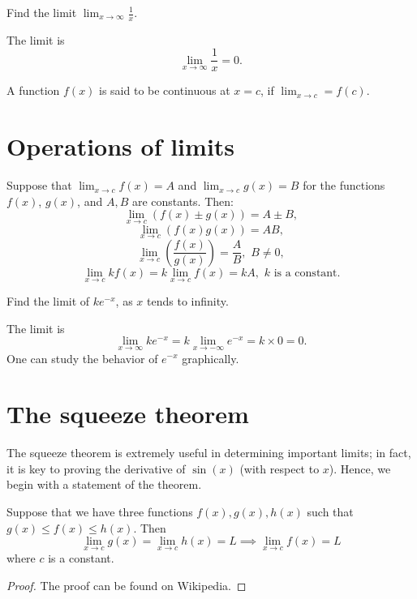 \begin{example}
    Find the limit $\lim_{x \to \infty} \frac{1}{x}$.
\end{example}
\begin{solution}
    The limit is \[\lim_{x \to \infty} \frac{1}{x} = 0.\]
\end{solution}

A function $f(x)$ is said to be continuous at $x = c$, if $\lim_{x \to c} = f(c)$.

\section{Operations of limits}
Suppose that $\lim_{x \to c} f(x) = A$ and $\lim_{x \to c} g(x) = B$ for the functions $f(x)$, $g(x)$,
and $A,B$ are constants. Then:
\[
\lim_{x \to c} (f(x) \pm g(x)) = A \pm B,
\]
\[
\lim_{x \to c} (f(x) g(x)) = A B,
\]
\[
\lim_{x \to c} \left(\frac{f(x)}{g(x)}\right)  = \frac{A}{B},\,\,B\ne 0,
\]
\[
\lim_{x \to c} kf(x) = k\lim_{x \to c} f(x) = kA,\,\,k\,\,\text{is a constant.}
\]

\begin{example}
    Find the limit of $k e^{-x}$, as $x$ tends to infinity. 
\end{example}
\begin{solution}
    The limit is \[\lim_{x \to \infty} k e^{-x} = k \lim_{x \to -\infty} e^{-x} = k \times 0 = 0.\]
    One can study the behavior of $e^{-x}$ graphically.
\end{solution}

\section{The squeeze theorem}
The squeeze theorem is extremely useful in determining important limits; in fact, it is key to proving the
derivative of $\sin(x)$ (with respect to $x$). Hence, we begin with a statement of the theorem.

\begin{theorem}
    Suppose that we have three functions $f(x), g(x), h(x)$ such that $g(x)\le f(x)\le h(x)$. Then
    \[
    \lim_{x \to c} g(x) = \lim_{x \to c} h(x) = L \implies \lim_{x \to c} f(x) = L
    \]
    where $c$ is a constant.
\end{theorem}
\begin{proof}
    The proof can be found on Wikipedia.
\end{proof}

